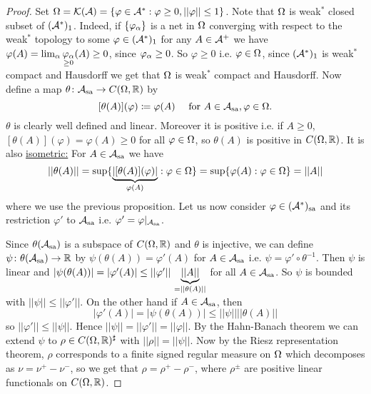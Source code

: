 \documentclass[10pt,english,a4paper]{article}
\theoremstyle{definition}
\def\Assa{\As_{\text{sa}}}
\def\sa{\text{sa}}
\def\vphi{\varphi}
\begin{document}
\begin{proof}
    Set $\Om = \Ks(\As) = \{\vphi \in \As^* : \vphi\geq 0, ||\vphi||\leq 1\}$.
    Note that $\Omega$ is weak$^*$ closed subset of $(\mathcal{A}^*)_{1}$. Indeed, if 
    $\{\vphi_{\al}\}$ is a net in $\Omega$ converging with respect to
    the weak$^*$ topology to some $\vphi \in (\As^*)_1$
    for any $A \in \mathcal{A}^+$ we have $\vphi(A) = \lim_{\al} \underset{\geq
    0}{\vphi_{\al}} (A)\geq 0$, since $\vphi_{\al}\geq 0$.
    So $\vphi\geq 0$ i.e. $\vphi \in \Om$, since $(\mathcal{A}^*)_1$ is weak$^*$ compact
    and Hausdorff we get that $\Omega$ is weak$^*$ compact and Hausdorff. Now
    define a map $\theta \colon \Assa \to C(\Om,\R)$ by 
    \[ [\theta(A)](\vphi)\coloneqq \vphi(A) \quad \text{ for }A\in \Assa, \vphi\in \Om.\]
    $\theta$ is clearly well defined and linear. Moreover it is positive i.e.
    if $A\geq 0$, $[\theta(A)](\vphi) = \vphi(A)\geq 0$ for all $\vphi \in
    \Om$, so $\theta (A)$ is positive in $C(\Omega,\mathbb{R})$. It is also \ul{isometric:} 
    For $A \in \Assa$ we have 
    \[ ||\theta(A)|| = \sup\{ \ub{|[\theta(A)](\vphi)|}_{\vphi(A)} : \vphi \in \Om \} 
    =\sup\{ \vphi(A) : \vphi \in \Om \} = ||A|| 
    \] 
    where we use the previous proposition. 
    Let us now consider $\vphi \in (\As^*)_{\sa}$ and its restriction 
    $\vphi'$ to $\Assa$ i.e. $\vphi' = \vphi\lvert_{\Assa}$.
    
    \begin{center}
    \end{center}    


    Since $\theta(\Assa)$ is a subspace of $C(\Omega,\mathbb{R})$ and $\theta$ is injective,
    we can define $\psi \colon \theta(\Assa) \to \R$ by 
$\psi(\theta(A)) = \vphi'(A)$ for $A\in \Assa$ i.e. $\psi = \vphi' \circ \theta^{-1}$.
Then $\psi$ is linear and $|\psi(\theta(A))| = |\vphi'(A)| \leq
||\vphi'||\,\ub{||A||}_{=||\theta(A)||} $ for all $A \in \Assa$.
So $\psi$ is bounded with $||\psi|| \leq||\vphi'||$. On the other hand if $A
\in \Assa$, then
\[ |\vphi'(A)| = |\psi(\theta(A))| \leq ||\psi|| ||\theta(A)||\]
so $||\vphi'||\leq ||\psi||$. Hence 
$||\psi|| = ||\vphi'|| = ||\vphi||$. By the Hahn-Banach theorem we can extend
$\psi$ to $\rho \in C(\Omega,\mathbb{R})^{\sharp}$ with $||\rho || = ||\psi||$.
Now by the Riesz representation theorem, $\rho$ corresponds to a finite 
signed regular measure on $\Omega$ which decomposes as $\nu =\nu^+-\nu^-$,
so we get that $\rho =\rho^+ - \rho^-$, where $\rho^{\pm}$ are positive linear functionals
on $C(\Omega,\mathbb{R})$. 


\end{proof}
\end{document}
